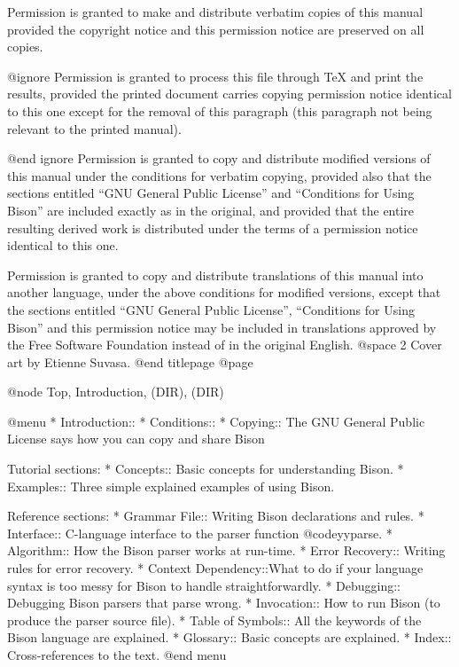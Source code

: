 Permission is granted to make and distribute verbatim copies of
this manual provided the copyright notice and this permission notice
are preserved on all copies.

@ignore
Permission is granted to process this file through TeX and print the
results, provided the printed document carries copying permission
notice identical to this one except for the removal of this paragraph
(this paragraph not being relevant to the printed manual).

@end ignore
Permission is granted to copy and distribute modified versions of this
manual under the conditions for verbatim copying, provided also that the
sections entitled ``GNU General Public License'' and ``Conditions for
Using Bison'' are included exactly as in the original, and provided that
the entire resulting derived work is distributed under the terms of a
permission notice identical to this one.

Permission is granted to copy and distribute translations of this manual
into another language, under the above conditions for modified versions,
except that the sections entitled ``GNU General Public License'',
``Conditions for Using Bison'' and this permission notice may be
included in translations approved by the Free Software Foundation
instead of in the original English.
@space 2
Cover art by Etienne Suvasa.
@end titlepage
@page

@node Top, Introduction, (DIR), (DIR)

@menu
* Introduction::
* Conditions::
* Copying::           The GNU General Public License says
                        how you can copy and share Bison

Tutorial sections:
* Concepts::          Basic concepts for understanding Bison.
* Examples::          Three simple explained examples of using Bison.

Reference sections:
* Grammar File::      Writing Bison declarations and rules.
* Interface::         C-language interface to the parser function @code{yyparse}.
* Algorithm::         How the Bison parser works at run-time.
* Error Recovery::    Writing rules for error recovery.
* Context Dependency::What to do if your language syntax is too
                        messy for Bison to handle straightforwardly.
* Debugging::         Debugging Bison parsers that parse wrong.
* Invocation::        How to run Bison (to produce the parser source file).
* Table of Symbols::  All the keywords of the Bison language are explained.
* Glossary::          Basic concepts are explained.
* Index::             Cross-references to the text.
@end menu

